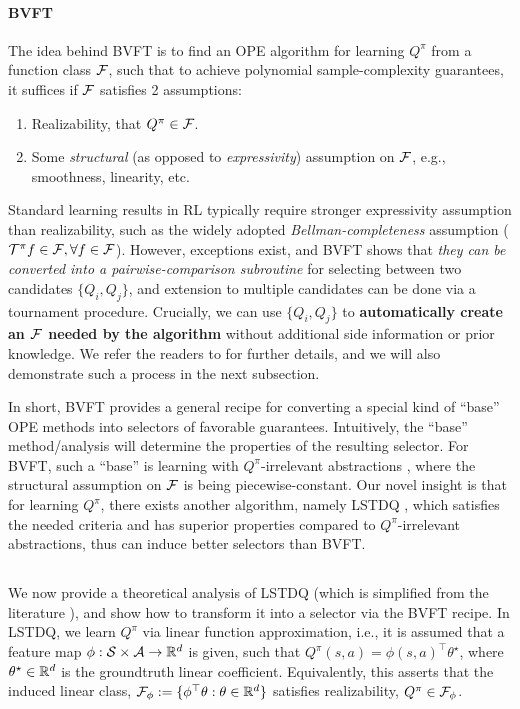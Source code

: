 \paragraph{BVFT} 
%
The idea behind BVFT \cite{xie2020batch} is to find an OPE algorithm for learning $Q^\pi$ from a function class $\mathcal{F}$, such that to achieve polynomial sample-complexity guarantees, it suffices if $\mathcal{F}$ satisfies 2 assumptions:
\begin{enumerate}[leftmargin=*, itemsep=1pt]
\item Realizability, that $Q^\pi \in \mathcal{F}$.
\item Some \textit{structural} (as opposed to \textit{expressivity}) assumption on $\mathcal{F}$, e.g., smoothness, linearity, etc.
\end{enumerate}
Standard learning results in RL typically require stronger expressivity assumption than realizability, such as the widely adopted \textit{Bellman-completeness} assumption ($\mathcal{T}^\pi f\in\mathcal{F}, \forall f\in\mathcal{F}$). However, exceptions exist, and 
BVFT shows that \textit{they can be converted into a pairwise-comparison subroutine} for selecting between two candidates $\{Q_i, Q_j\}$, and extension to multiple candidates can be done via a tournament procedure. Crucially, we can use $\{Q_i, Q_j\}$ to \textbf{automatically create an $\mathcal{F}$ needed by the algorithm} without additional side information or prior knowledge. We refer the readers to \cite{xie2020batch} for further details, and we will also demonstrate such a process in the next subsection. 
%
%

In short, BVFT provides a general recipe for converting a special kind of ``base'' OPE methods into selectors of favorable guarantees. Intuitively, the ``base'' method/analysis will determine the properties of the resulting selector. 
For BVFT, such a ``base'' is learning with $Q^\pi$-irrelevant abstractions \cite{li2006towards, nan_abstraction_notes}, where the structural assumption on $\mathcal{F}$ is being piecewise-constant. Our novel insight is that for learning $Q^\pi$, there exists another algorithm, namely LSTDQ \cite{lagoudakis2003least}, which satisfies the needed criteria and has superior properties compared to $Q^\pi$-irrelevant abstractions, thus can induce better selectors than BVFT. 

\subsection{\lstd} 
We now provide a theoretical analysis of LSTDQ (which is simplified from the literature \cite{mou2023optimal,perdomo2023complete}), and show how to transform it into a selector via the BVFT recipe. 
In LSTDQ, we learn $Q^\pi$ via linear function approximation, i.e., it is assumed that a feature map $\phi: \mathcal{S}\times\mathcal{A} \to \mathbb{R}^d$ is given, such that $Q^\pi(s,a) = \phi(s,a)^\top \theta^\star$, %
where $\theta^\star\in\mathbb{R}^d$ is the groundtruth linear coefficient. Equivalently, this asserts that the induced linear class, $\mathcal{F}_\phi := \{ \phi^\top \theta: \theta \in \mathbb{R}^d\}$ satisfies realizability, $Q^\pi \in \mathcal{F}_\phi$. %

